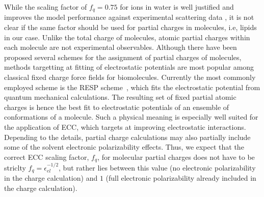\documentclass[aip,jcp,twocolumn]{revtex4}
\begin{document}
While the scaling factor of $f_q = 0.75$ for ions in water is well justified and 
improves the model performance against experimental scattering data \cite{kohagen14,kohagen16, Pluharova2014},
it is not clear if the same factor should be used for partial charges in molecules,
i.e, lipids in our case. 
Unlike the total charge of molecules, atomic partial charges within each molecule are not experimental observables.
Although there have been proposed several schemes for the assignment of partial charges of molecules, 
methods targetting at fitting of electrostatic potentials are 
most popular among classical fixed charge force fields for biomolecules. \cite{Hu2007}
Currently the most commonly employed scheme is the RESP scheme~\cite{RESP_paper,Singh1984}, 
which fits the electrostatic potential from quantum mechanical calculations. 
The resulting set of fixed partial atomic charges is hence 
the best fit to electrostatic potentials of 
an ensemble of conformations of a molecule. 
Such a physical meaning is especially well suited for the application of ECC, 
which targets at improving electrostatic interactions. 
Depending to the details, partial charge calculations may also partially
include some of the solvent electronic polarizability effects. 
Thus, we expect that
the correct ECC scaling factor, $f_q$, for molecular partial charges
does not have to be striclty $f_q = \epsilon _{el} ^{-1/2}$, 
but rather lies between this value (no electronic polarizability in the charge calculation)
and $1$ (full electronic polarizability already included in the charge calculation).
%
%
%
%
%
\end{document}

